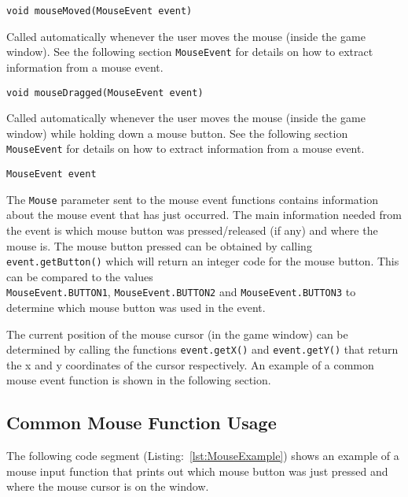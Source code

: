 \documentclass[a4paper, 10pt]{report}
\begin{document}
\hrulefill

{\large {\tt void mouseMoved(MouseEvent event)}}

Called automatically whenever the user moves the mouse (inside the game window). See the following section {\tt MouseEvent} for details on how to extract information from a mouse event.

\hrulefill

{\large {\tt void mouseDragged(MouseEvent event)}}

Called automatically whenever the user moves the mouse (inside the game window) while holding down a mouse button. See the following section {\tt MouseEvent} for details on how to extract information from a mouse event.

\hrulefill

{\large {\tt MouseEvent event}}

The {\tt Mouse} parameter sent to the mouse event functions contains information about the mouse event that has just occurred. The main information needed from the event is which mouse button was pressed/released (if any) and where the mouse is. The mouse button pressed can be obtained by calling {\tt event.getButton()} which will return an integer code for the mouse button. This can be compared to the values \\{\tt MouseEvent.BUTTON1}, {\tt MouseEvent.BUTTON2} and {\tt MouseEvent.BUTTON3} to determine which mouse button was used in the event.

The current position of the mouse cursor (in the game window) can be determined by calling the functions {\tt event.getX()} and {\tt event.getY()} that return the x and y coordinates of the cursor respectively. An example of a common mouse event function is shown in the following section.

\hrulefill

\subsection*{Common Mouse Function Usage} \nonumber

The following code segment (Listing:~\ref{lst:MouseExample}) shows an example of a mouse input function that prints out which mouse button was just pressed and where the mouse cursor is on the window.
\end{document}
